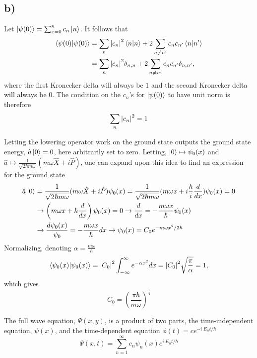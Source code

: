 \documentclass{article}
\begin{document}
\subsection*{b)}
Let $\ket{\psi(0)}=\sum_{x=0}^n c_n\ket{n}$. It follows that
\begin{align*}
\braket{\psi(0)} &= \sum_n \abs{c_n}^2 \braket{n} + 2\sum_{n \neq n'} c_nc_{n'} \braket{n}{n'} \\
 &= \sum_n \abs{c_n}^2 \delta_{n,n} + 2\sum_{n \neq n'} c_nc_{n'} \delta_{n,n'}, 
\end{align*}
where the first Kronecker delta will always be $1$ and the second Kronecker delta will always be $0$. The condition on the $c_n$'s for $\ket{\psi(0)}$ to have unit norm is therefore
\begin{equation}
\sum_n \abs{c_n}^2 = 1
\end{equation}

Letting the lowering operator work on the ground state outputs the ground state energy, $\hat{a}\ket{0}=0$, here arbitrarily set to zero. Letting, $\ket{0} \mapsto \psi_0(x)$ and $\hat{a} \mapsto \frac{1}{\sqrt{2\hbar m \omega}}(m\omega \hat{X} + i\hat{P})$, one can expand upon this idea to find an expression for the ground state
\begin{align*}
\hat{a}\ket{0}&=\frac{1}{\sqrt{2\hbar m\omega}}(m\omega \hat{X} + i\hat{P})\psi_0(x) = \frac{1}{\sqrt{2\hbar m\omega}}(m\omega x + i\frac{\hbar}{i}\frac{d}{d x})\psi_0(x) = 0\\
&\rightarrow \left(m\omega x + \hbar\frac{d}{d x}\right)\psi_0(x)=0 \rightarrow \frac{d}{d x} = -\frac{m\omega x}{\hbar} \psi_0(x) \\
&\rightarrow \frac{d \psi_0(x)}{\psi_0}=-\frac{m\omega x}{\hbar} d x \rightarrow \psi_0(x) = C_0e^{-m\omega x^2/2\hbar}
\end{align*}
Normalizing, denoting $\alpha = \frac{m\omega}{\hbar}$
\begin{align*}
\braket{\psi_0(x)} = \abs{C_0}^2\int_{-\infty}^{\infty}e^{-\alpha x^2}dx = \abs{C_0}^2\sqrt{\frac{\pi}{\alpha}}=1,
\end{align*}
which gives
\begin{equation}
C_0=\left(\frac{\pi\hbar}{m\omega}\right)^{\frac{1}{4}}
\end{equation}

The full wave equation, $\Psi(x,y)$, is a product of two parts, the time-independent equation, $\psi(x)$, and the time-dependent equation $\phi(t)=ce^{-i\ E_n t/\hbar}$
\begin{equation}
\Psi(x,t)=\sum_{n=1}^{\infty}c_n\psi_n(x)e^{i\ E_n t/\hbar}
\end{equation}
\end{document}

